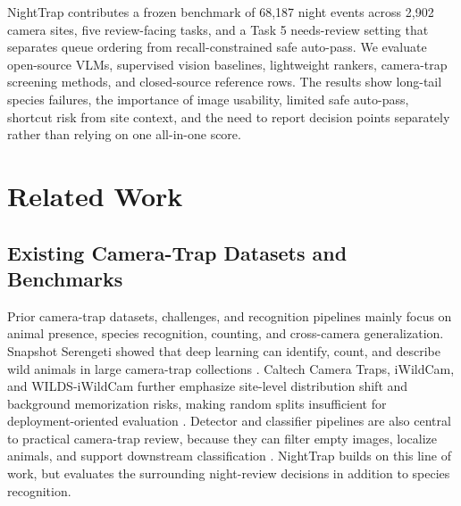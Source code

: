 \documentclass{article}
\begin{document}
NightTrap contributes a frozen benchmark of 68,187 night events across 2,902 camera sites, five review-facing tasks, and a Task 5 needs-review setting that separates queue ordering from recall-constrained safe auto-pass. We evaluate open-source VLMs, supervised vision baselines, lightweight rankers, camera-trap screening methods, and closed-source reference rows. The results show long-tail species failures, the importance of image usability, limited safe auto-pass, shortcut risk from site context, and the need to report decision points separately rather than relying on one all-in-one score.
\section{Related Work}

\subsection{Existing Camera-Trap Datasets and Benchmarks}

Prior camera-trap datasets, challenges, and recognition pipelines mainly focus on animal presence, species recognition, counting, and cross-camera generalization. Snapshot Serengeti showed that deep learning can identify, count, and describe wild animals in large camera-trap collections \citep{norouzzadeh2017snapshot}. Caltech Camera Traps, iWildCam, and WILDS-iWildCam further emphasize site-level distribution shift and background memorization risks, making random splits insufficient for deployment-oriented evaluation \citep{beery2019iwildcam,koh2021wilds}. Detector and classifier pipelines are also central to practical camera-trap review, because they can filter empty images, localize animals, and support downstream classification \citep{schneider2018camera,choinski2021first,gomez2016towards,beery2019pipeline}. NightTrap builds on this line of work, but evaluates the surrounding night-review decisions in addition to species recognition.
\end{document}
